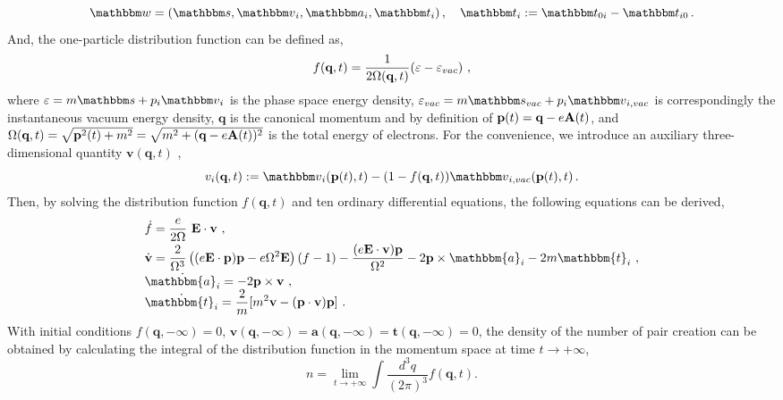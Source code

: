 \documentclass[aps,preprint,superscriptaddress]{revtex4}
\begin{document}
\begin{equation}
{\mathbbm w} = ( {\mathbbm s},{\mathbbm v}_i,{\mathbbm a}_i,{\mathbbm t}_i)
\, , \quad {\mathbbm t}_i := {\mathbbm t}_{0i} - {\mathbbm t}_{i0} \, .
\end{equation}
And, the one-particle distribution function can be defined as,
\begin{equation}
f({\textbf q},t) = \frac 1 {2 \Omega(\textbf{q},t)} (\varepsilon - \varepsilon_{vac} )\ ,
\end{equation}
where
$\varepsilon = m {\mathbbm s} + p_i {\mathbbm v}_i$
is the phase space energy density,
$\varepsilon_{vac} = m {\mathbbm s}_{vac} + p_i {\mathbbm v}_{i,vac}$ is correspondingly the instantaneous vacuum energy density, $\textbf{q}$ is the canonical momentum and by definition of ${\textbf p}(t) = {\textbf q} - e {\textbf A} (t)$, and
$\Omega(\textbf{q},t)= \sqrt{{\textbf p}^2(t)+m^2}=
\sqrt{m^{2}+(\textbf{q}-e\textbf{A}(t))^{2}}$
is the total energy of electrons.
For the convenience, we introduce an auxiliary three-dimensional quantity $\textbf{v}(\textbf{q},t)$ \cite{Blinne2},
\begin{equation}
v_i (\textbf{q},t) : = {\mathbbm v}_i (\textbf{p}(t),t) -
(1-f({\textbf q},t)) {\mathbbm v}_{i,vac} (\textbf{p}(t),t) \, .
\end{equation}
Then, by solving the distribution function
$f(\textbf{q},t)$ and ten ordinary differential equations, the following equations can be derived,
\begin{equation}
\begin{array}{l}
\displaystyle
\dot{f}=\frac{e}{2\Omega} \, \, \textbf{E}\cdot \textbf{v}\ ,\\[2mm]
\displaystyle
\dot{\textbf{v}}=\frac{2}{\Omega^{3}}
\left( (e\textbf{E}\cdot \textbf{p})\textbf{p}-e\Omega^{2}\textbf{E}\right) (f-1)
-\frac{(e\textbf{E}\cdot \textbf{v})\textbf{p}}{\Omega^{2}}
-2\textbf{p}\times \mathbbm{a}_i -2m \mathbbm{t}_i\ ,\\[2mm]
\displaystyle
\dot{\mathbbm{a}_i}=-2\textbf{p}\times \textbf{v}\ ,\\
\displaystyle
\dot{\mathbbm{t}_i}=\frac{2}{m}[m^{2}\textbf{v}-(\textbf{p}\cdot \textbf{v})\textbf{p}]\ .
\end{array}
\end{equation}
With initial conditions
$f(\textbf{q},-\infty)=0$,
$\textbf{v}(\textbf{q},-\infty)=
\textbf{a}(\textbf{q},-\infty)=\textbf{t}(\textbf{q},-\infty)=0$, the density of the number of pair creation can be obtained by calculating the integral of the distribution function in the momentum space at time $t\to +\infty$,
\begin{equation}\label{3}
n = \lim_{t\to +\infty}\int\frac{d^{3}q}{(2\pi)^ 3}f(\textbf{q},t)  .
\end{equation}
\end{document}

